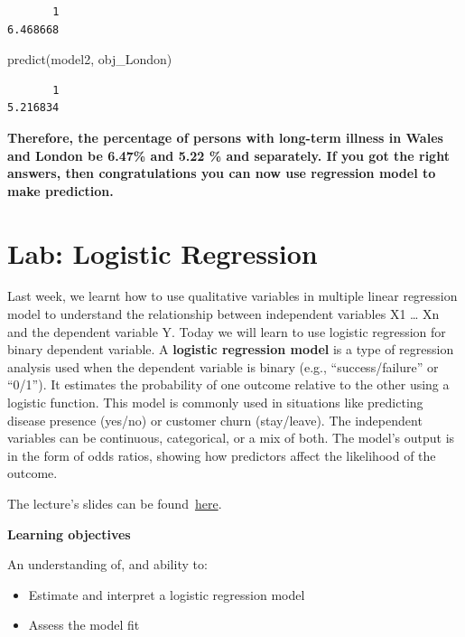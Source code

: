 \documentclass[
  letterpaper,
  DIV=11,
  numbers=noendperiod]{scrreprt}
\newenvironment{Shaded}{\begin{snugshade}}{\end{snugshade}}
\newcommand{\FunctionTok}[1]{\textcolor[rgb]{0.28,0.35,0.67}{#1}}
\newcommand{\NormalTok}[1]{\textcolor[rgb]{0.00,0.23,0.31}{#1}}
\begin{document}
\begin{verbatim}
       1 
6.468668 
\end{verbatim}

\begin{Shaded}
\begin{Highlighting}[]
\FunctionTok{predict}\NormalTok{(model2, obj\_London)}
\end{Highlighting}
\end{Shaded}

\begin{verbatim}
       1 
5.216834 
\end{verbatim}

\textbf{Therefore, the percentage of persons with long-term illness in
Wales and London be 6.47\% and 5.22 \% and separately. If you got the
right answers, then congratulations you can now use regression model to
make prediction.}


\chapter{Lab: Logistic Regression}\label{lab-logistic-regression}

Last week, we learnt how to use qualitative variables in multiple linear
regression model to understand the relationship between independent
variables X1 \ldots{} Xn and the dependent variable Y. Today we will
learn to use logistic regression for binary dependent variable. A
\textbf{logistic regression model} is a type of regression analysis used
when the dependent variable is binary (e.g., ``success/failure'' or
``0/1''). It estimates the probability of one outcome relative to the
other using a logistic function. This model is commonly used in
situations like predicting disease presence (yes/no) or customer churn
(stay/leave). The independent variables can be continuous, categorical,
or a mix of both. The model's output is in the form of odds ratios,
showing how predictors affect the likelihood of the outcome.

The lecture's slides can be
found~\href{https://github.com/GDSL-UL/stats/blob/main/lectures/lecture04.pdf}{here}.

\textbf{Learning objectives}

An understanding of, and ability to:

\begin{itemize}
\item
  Estimate and interpret a logistic regression model
\item
  Assess the model fit
\end{itemize}
\end{document}
